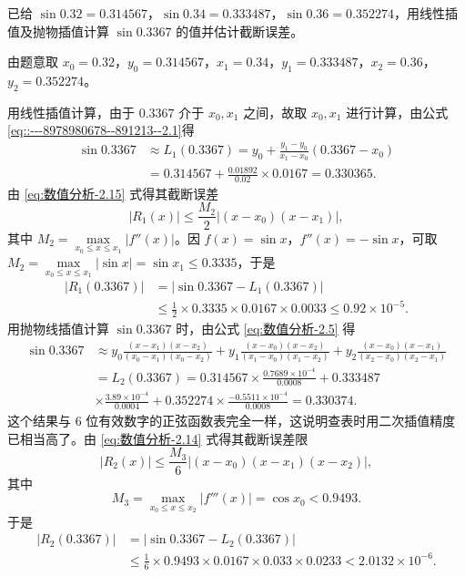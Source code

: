 \documentclass[../../main.tex]{subfiles}
\begin{document}
\begin{example}
已给 $\sin 0.32 = 0.314567$，$\sin 0.34 = 0.333487$，$\sin 0.36 = 0.352274$，用线性插值及抛物插值计算 $\sin 0.3367$ 的值并估计截断误差。
\end{example}
\begin{solution}
由题意取 $x_0 = 0.32$，$y_0 = 0.314567$，$x_1 = 0.34$，$y_1 = 0.333487$，$x_2 = 0.36$，$y_2 = 0.352274$。

用线性插值计算，由于 $0.3367$ 介于 $x_0, x_1$ 之间，故取 $x_0, x_1$ 进行计算，由公式\eqref{eq::---8978980678--891213--2.1}得 
\begin{align*}
\sin 0.3367 &\approx L_1(0.3367) = y_0 + \frac{y_1 - y_0}{x_1 - x_0}(0.3367 - x_0) \\
&= 0.314567 + \frac{0.01892}{0.02} \times 0.0167 = 0.330365.
\end{align*}
由 \eqref{eq:数值分析-2.15} 式得其截断误差 
\[
|R_1(x)| \leqslant \frac{M_2}{2} |(x - x_0)(x - x_1)|,
\]
其中 $M_2 = \max\limits_{x_0 \leqslant x \leqslant x_1} |f''(x)|$。因 $f(x) = \sin x$，$f''(x) = -\sin x$，可取 $M_2 = \max\limits_{x_0 \leqslant x \leqslant x_1} |\sin x| = \sin x_1 \leqslant 0.3335$，于是 
\begin{align*}
|R_1(0.3367)| &= |\sin 0.3367 - L_1(0.3367)| \\
&\leqslant \frac{1}{2} \times 0.3335 \times 0.0167 \times 0.0033 \leqslant 0.92 \times 10^{-5}.
\end{align*}
用抛物线插值计算 $\sin 0.3367$ 时，由公式 \eqref{eq:数值分析-2.5} 得 
\begin{align*}
\sin 0.3367 &\approx y_0 \frac{(x - x_1)(x - x_2)}{(x_0 - x_1)(x_0 - x_2)} + y_1 \frac{(x - x_0)(x - x_2)}{(x_1 - x_0)(x_1 - x_2)} + y_2 \frac{(x - x_0)(x - x_1)}{(x_2 - x_0)(x_2 - x_1)} \\
&= L_2(0.3367) = 0.314567 \times \frac{0.7689 \times 10^{-4}}{0.0008} + 0.333487 \\
&\times \frac{3.89 \times 10^{-4}}{0.0004} + 0.352274 \times \frac{-0.5511 \times 10^{-4}}{0.0008} = 0.330374.
\end{align*}
这个结果与 6 位有效数字的正弦函数表完全一样，这说明查表时用二次插值精度已相当高了。由 \eqref{eq:数值分析-2.14} 式得其截断误差限 
\[
|R_2(x)| \leqslant \frac{M_3}{6} |(x - x_0)(x - x_1)(x - x_2)|,
\]
其中 
\[
M_3 = \max\limits_{x_0 \leqslant x \leqslant x_2} |f'''(x)| = \cos x_0 < 0.9493.
\]
于是 
\begin{align*}
|R_2(0.3367)| &= |\sin 0.3367 - L_2(0.3367)| \\
&\leqslant \frac{1}{6} \times 0.9493 \times 0.0167 \times 0.033 \times 0.0233 < 2.0132 \times 10^{-6}.
\end{align*}
\end{solution}
\end{document}

